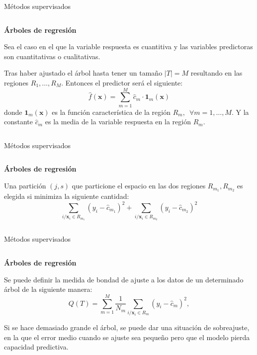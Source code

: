 \begin{frame}{Métodos supervisados}
\begin{columns}
\begin{column}{0.9\textwidth}
\textbf{Árboles de regresión}

Sea el caso en el que la variable respuesta es cuantitiva y las variables predictoras son cuantitativas o cualitativas.

Tras haber ajustado el árbol hasta tener un tamaño $|T|=M$ resultando en las regiones $R_1,\ldots, R_M$. Entonces el predictor será el siguiente: 
\begin{equation}
\hat{f}(\mathbf{x})=\sum_{m=1}^M \hat{c}_m\cdot \mathbf{1}_m(\mathbf{x})
\end{equation}
donde $\mathbf{1}_m(\mathbf{x})$ es la función característica de la región $R_m,\enspace \forall m=1,\ldots, M$. Y la constante $\hat{c}_m$ es la media de la variable respuesta en la región $R_m$.
\end{column}
\end{columns}
\end{frame}



\begin{frame}{Métodos supervisados}
\begin{columns}
\begin{column}{0.9\textwidth}
\textbf{Árboles de regresión}

Una partición $(j,s)$ que particione el espacio en las dos regiones $R_{m_1},R_{m_2}$ es elegida si minimiza la siguiente cantidad:
\begin{equation}
\sum_{i/\mathbf{x}_i\in R_{m_1} } (y_i-\hat{c}_{m_1})^2+\sum_{i/\mathbf{x}_i\in R_{m_2} } (y_i-\hat{c}_{m_2})^2
\end{equation}
\end{column}
\end{columns}
\end{frame}

\begin{frame}{Métodos supervisados}
\begin{columns}
\begin{column}{0.9\textwidth}
\textbf{Árboles de regresión}

Se puede definir la medida de bondad de ajuste a los datos de un determinado árbol de la siguiente manera:
\begin{equation}
Q(T)=\sum_{m=1}^M\frac{1}{N_m}\sum_{i/\mathbf{x}_i\in R_m} (y_i-\hat{c}_m)^2,
\end{equation}

Si se hace demasiado grande el árbol, se puede dar una situación de sobreajuste, en la que el error medio cuando se ajuste sea pequeño pero que el modelo pierda capacidad predictiva. 

\end{column}
\end{columns}
\end{frame}

